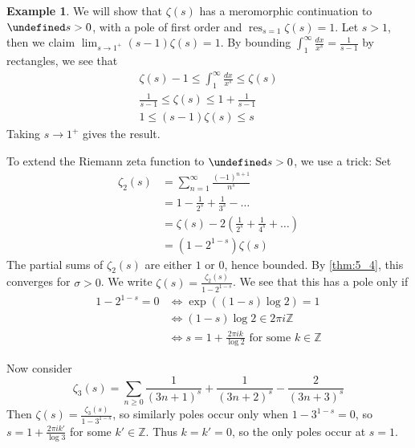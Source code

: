\documentclass[11pt]{article}
\theoremstyle{definition}
\newtheorem{example}[definition]{Example}
\theoremstyle{plain}
\theoremstyle{remark}
\let\Re\undefined
\DeclareMathOperator{\Re}{Re}
\DeclareMathOperator{\res}{res}
\newcommand{\ZZ}{\mathbb{Z}}
\begin{document}
\begin{example}\label{eg:5_6}
    We will show that $\zeta(s)$ has a meromorphic continuation to $\Re s > 0$, with a pole of first order and $\res_{s=1} \zeta(s) = 1$. Let $s > 1$, then we claim $\lim_{s \to 1^+} (s-1) \zeta(s) = 1$. By bounding $\int_1^\infty \frac{dx}{x^s} = \frac{1}{s-1}$ by rectangles, we see that
    \begin{gather*}
        \zeta(s) - 1 \le \int_1^\infty \frac{dx}{x^s} \le \zeta(s)\\
        \frac{1}{s-1} \le \zeta(s) \le 1 + \frac{1}{s-1}\\
        1 \le (s-1) \zeta(s) \le s
    \end{gather*}
    Taking $s \to 1^+$ gives the result.

    To extend the Riemann zeta function to $\Re s > 0$, we use a trick: Set
    \begin{align*}
        \zeta_2(s)
        &= \sum_{n=1}^\infty \frac{(-1)^{n+1}}{n^s}\\
        &= 1 - \frac{1}{2^s} + \frac{1}{3^s} - \ldots\\
        &= \zeta(s) - 2\left(\frac{1}{2^s} + \frac{1}{4^s} + \ldots\right)\\
        &= (1-2^{1-s}) \zeta(s)
    \end{align*}
    The partial sums of $\zeta_2(s)$ are either $1$ or $0$, hence bounded. By \autoref{thm:5_4}, this converges for $\sigma > 0$. We write $\zeta(s) = \frac{\zeta_2(s)}{1-2^{1-s}}$. We see that this has a pole only if
    \begin{align*}
        1 - 2^{1-s} = 0
        &\iff \exp((1-s) \log 2) = 1\\
        &\iff (1-s) \log 2 \in 2 \pi i \ZZ\\
        &\iff s = 1 + \frac{2 \pi i k}{\log 2} \text{ for some } k \in \ZZ
    \end{align*}
\end{example}
Now consider
\begin{equation*}
    \zeta_3(s) = \sum_{n \ge 0} \frac{1}{(3n+1)^s} + \frac{1}{(3n+2)^s} - \frac{2}{(3n+3)^s}
\end{equation*}
Then $\zeta(s) = \frac{\zeta_3(s)}{1-3^{1-s}}$, so similarly poles occur only when $1-3^{1-s} = 0$, so $s = 1 + \frac{2 \pi i k'}{\log 3}$ for some $k' \in \ZZ$. Thus $k = k' = 0$, so the only poles occur at $s = 1$.
\end{document}

